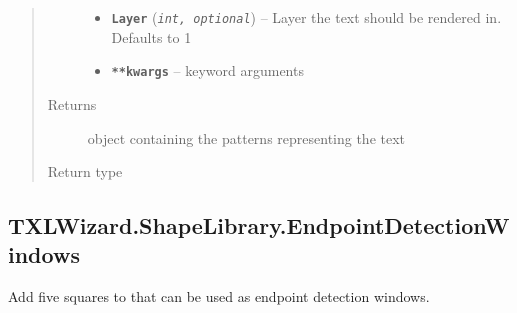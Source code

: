 \documentclass[letterpaper,10pt,english]{sphinxmanual}
\begin{document}
\begin{fulllineitems}
\begin{quote}
\begin{description}
\begin{itemize}
\item {} 
\textbf{\texttt{Layer}} (\emph{\texttt{int, optional}}) -- Layer the text should be rendered in.
Defaults to 1

\item {} 
\textbf{\texttt{**kwargs}} -- keyword arguments

\end{itemize}

\item[{Returns}] \leavevmode
{} object containing the patterns representing the text

\item[{Return type}] \leavevmode
{\hyperref[Chapters/PythonModuleReference/Patterns/TXLWizard.Patterns.Structure:TXLWizard.Patterns.Structure.Structure]{}}

\end{description}\end{quote}

\end{fulllineitems}



\subsection{TXLWizard.ShapeLibrary.EndpointDetectionWindows}
\label{Chapters/PythonModuleReference/ShapeLibrary/TXLWizard.ShapeLibrary.EndpointDetectionWindows:module-TXLWizard.ShapeLibrary.EndpointDetectionWindows}\label{Chapters/PythonModuleReference/ShapeLibrary/TXLWizard.ShapeLibrary.EndpointDetectionWindows::doc}\label{Chapters/PythonModuleReference/ShapeLibrary/TXLWizard.ShapeLibrary.EndpointDetectionWindows:txlwizard-shapelibrary-endpointdetectionwindows}
Add five squares to  that can be used as endpoint detection windows.
\end{document}
